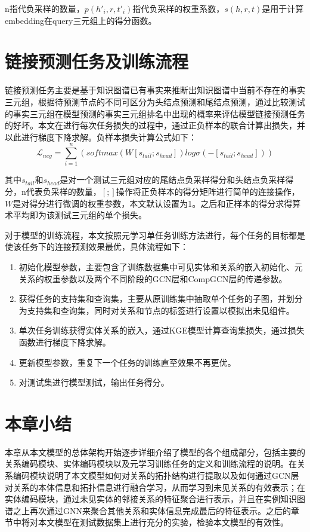 n指代负采样的数量，\(p(h'_{i},r,t'_{i})\)指代负采样的权重系数，\(s(h,r,t)\)是用于计算embedding在query三元组上的得分函数。

\section{链接预测任务及训练流程}
链接预测任务主要是基于知识图谱已有事实来推断出知识图谱中当前不存在的事实三元组，根据待预测节点的不同可区分为头结点预测和尾结点预测，通过比较测试的事实三元组在模型预测的事实三元组排名中出现的概率来评估模型链接预测任务的好坏。本文在进行每次任务损失的过程中，通过正负样本的联合计算出损失，并以此进行梯度下降求解。负样本损失计算公式如下：
\begin{equation}
\mathcal{L}_{neg} = \sum_{i = 1}^{n} \left( softmax(W[s_{tail};s_{head}])log \sigma (- [s_{tail};s_{head}]) \right) \label{eq:3-18}
\end{equation}

其中\(s_{tail}\)和\(s_{head}\)是对一个测试三元组对应的尾结点负采样得分和头结点负采样得分，n代表负采样的数量，\([;]\)操作将正负样本的得分矩阵进行简单的连接操作，\(W\)是对得分进行微调的权重参数，本文默认设置为1。之后和正样本的得分求得算术平均即为该测试三元组的单个损失。

对于模型的训练流程，本文按照元学习单任务训练方法进行，每个任务的目标都是使该任务下的连接预测效果最优，具体流程如下：

\begin{enumerate}[label=\arabic*)]
  \item 初始化模型参数，主要包含了训练数据集中可见实体和关系的嵌入初始化、元关系的权重参数以及两个不同阶段的GCN层和CompGCN层的传递参数。
  \item 获得任务的支持集和查询集，主要从原训练集中抽取单个任务的子图，并划分为支持集和查询集，同时对关系和节点的标签进行设置以模拟出未见组件。
  \item 单次任务训练获得实体关系的嵌入，通过KGE模型计算查询集损失，通过损失函数进行梯度下降求解。
  \item 更新模型参数，重复下一个任务的训练直至效果不再更优。
  \item 对测试集进行模型测试，输出任务得分。
\end{enumerate}

\section{本章小结}
本章从本文模型的总体架构开始逐步详细介绍了模型的各个组成部分，包括主要的关系编码模块、实体编码模块以及元学习训练任务的定义和训练流程的说明。在关系编码模块说明了本文模型如何对关系的拓扑结构进行提取以及如何通过GCN层对关系的本体信息和拓扑信息进行融合学习，从而学习到未见关系的有效表示；在实体编码模块，通过未见实体的邻接关系的特征聚合进行表示，并且在实例知识图谱之上再次通过GNN来聚合其他关系和实体信息完成最后的特征表示。之后的章节中将对本文模型在测试数据集上进行充分的实验，检验本文模型的有效性。
